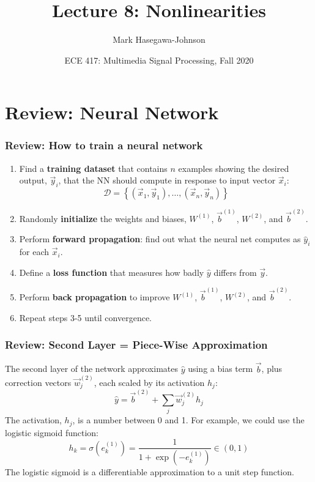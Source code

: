 \documentclass{beamer}
\title{Lecture 8: Nonlinearities}
\author{Mark Hasegawa-Johnson}
\date{ECE 417: Multimedia Signal Processing, Fall 2020}
\begin{document}
\begin{frame}
  \maketitle
\end{frame}

\begin{frame}
  \tableofcontents
\end{frame}


\section[Review]{Review: Neural Network}
\setcounter{subsection}{1}

\begin{frame}
  \frametitle{Review: How to train a neural network}
  \begin{enumerate}
  \item Find a {\bf training dataset} that contains $n$ examples showing the
    desired output, $\vec{y}_i$, that the NN should compute in
    response to input vector $\vec{x}_i$:
    \[
    {\mathcal D}=\left\{(\vec{x}_1,\vec{y}_1),\ldots,(\vec{x}_n,\vec{y}_n)\right\}
    \]
    \item Randomly {\bf initialize} the weights and biases, $W^{(1)}$,
      $\vec{b}^{(1)}$, $W^{(2)}$, and $\vec{b}^{(2)}$.
    \item Perform {\bf forward propagation}: find out what the neural
      net computes as $\hat{y}_i$ for each $\vec{x}_i$.
    \item Define a {\bf loss function} that measures
      how badly $\hat{y}$ differs from $\vec{y}$.
    \item Perform {\bf back propagation} to improve $W^{(1)}$,
      $\vec{b}^{(1)}$, $W^{(2)}$, and $\vec{b}^{(2)}$.
    \item Repeat steps 3-5 until convergence.
  \end{enumerate}
\end{frame}

\begin{frame}
  \frametitle{Review: Second Layer = Piece-Wise Approximation}

  The second layer of the network approximates $\hat{y}$ using a bias term $\vec{b}$,
  plus correction vectors $\vec{w}_j^{(2)}$, each scaled by its activation $h_j$:
  \[
  \hat{y} = \vec{b}^{(2)} + \sum_j \vec{w}_{j}^{(2)} h_j
  \]
  The activation, $h_j$, is a number between 0 and 1.  For example, we could
  use the logistic sigmoid function:
  \[
  h_k = \sigma\left(e_k^{(1)}\right)=\frac{1}{1+\exp(-e_k^{(1)})}\in\left(0,1\right)
  \]
  The logistic sigmoid is a differentiable approximation to a unit step function.
\end{frame}
\end{document}
